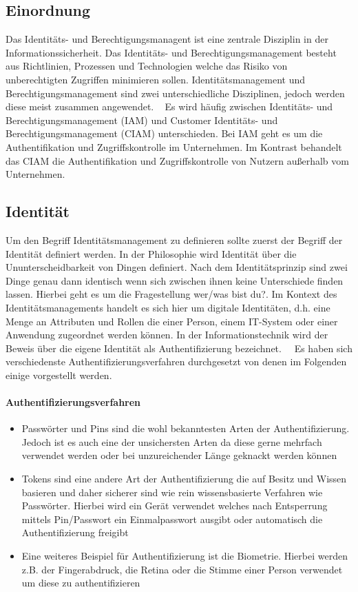\documentclass[12pt]{article}
\begin{document}
\subsection{Einordnung}
Das Identitäts- und Berechtigungsmanagent ist eine zentrale Disziplin in der Informationssicherheit. Das Identitäts- und Berechtigungsmanagement besteht aus Richtlinien, Prozessen und Technologien welche das Risiko von unberechtigten Zugriffen minimieren sollen. Identitätsmanagement und Berechtigungsmanagement sind zwei unterschiedliche Disziplinen, jedoch werden diese meist zusammen angewendet. ~\cite{mohammed2017systematic} Es wird häufig zwischen Identitäts- und Berechtigungsmanagement (IAM) und Customer Identitäts- und Berechtigungsmanagement (CIAM) unterschieden. Bei IAM geht es um die Authentifikation und Zugriffskontrolle im Unternehmen. Im Kontrast behandelt das CIAM die Authentifikation und Zugriffskontrolle von Nutzern außerhalb vom Unternehmen.~\cite{mohammed2017systematic} ~\cite{liveretos2022customer}
\subsection{Identität}
Um den Begriff Identitätsmanagement zu definieren sollte zuerst der Begriff der Identität definiert werden. In der Philosophie wird Identität über die Ununterscheidbarkeit von Dingen definiert. Nach dem Identitätsprinzip sind zwei Dinge genau dann identisch wenn sich zwischen ihnen keine Unterschiede finden lassen. Hierbei geht es um die Fragestellung \glqq{}wer/was bist du?\grqq{}. Im Kontext des Identitätsmanagements handelt es sich hier um digitale Identitäten, d.h. eine Menge an Attributen und Rollen die einer Person, einem IT-System oder einer Anwendung zugeordnet werden können. In der Informationstechnik wird der Beweis über die eigene Identität als Authentifizierung bezeichnet.~\cite{tsolkas2017}~\cite{camp2004digital} Es haben sich verschiedenste Authentifizierungsverfahren durchgesetzt von denen im Folgenden einige vorgestellt werden.
\paragraph{Authentifizierungsverfahren}
\begin{itemize}
  \item Passwörter und Pins sind die wohl bekanntesten Arten der Authentifizierung. Jedoch ist es auch eine der unsichersten Arten da diese gerne mehrfach verwendet werden oder bei unzureichender Länge geknackt werden können~\cite{tsolkas2017}
  \item Tokens sind eine andere Art der Authentifizierung die auf Besitz und Wissen basieren und daher sicherer sind wie rein wissensbasierte Verfahren wie Passwörter. Hierbei wird ein Gerät verwendet welches nach Entsperrung mittels Pin/Passwort ein Einmalpasswort ausgibt oder automatisch die Authentifizierung freigibt~\cite{tsolkas2017}
  \item Eine weiteres Beispiel für Authentifizierung ist die Biometrie. Hierbei werden z.B. der Fingerabdruck, die Retina oder die Stimme einer Person verwendet um diese zu authentifizieren~\cite{tsolkas2017}
\end{itemize}
\end{document}
